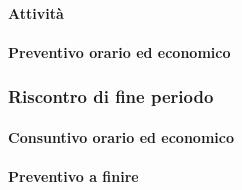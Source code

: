 
\paragraph{Attività}

\planningTable{
	
}



\paragraph{Preventivo orario ed economico}



\subsubsection{Riscontro di fine periodo}


\paragraph{Consuntivo orario ed economico}


\paragraph{Preventivo a finire}
